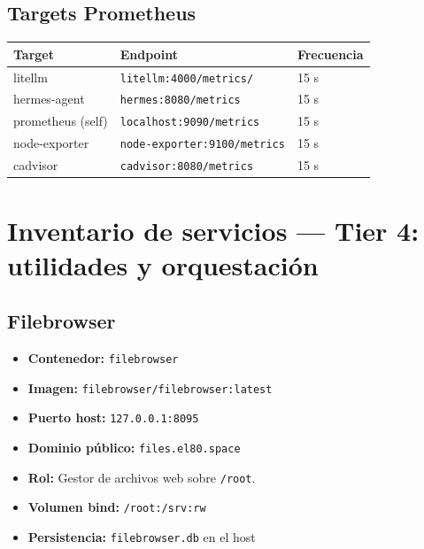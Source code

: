 \documentclass[11pt,a4paper]{article}
\newcommand{\dato}[2]{\textbf{\color{hermesblue}#1:} #2}
\begin{document}
\subsection{Targets Prometheus}

\begin{center}
\begin{tabular}{|l|l|l|}
\hline
\rowcolor{hermesblue}\color{white}\textbf{Target} & \color{white}\textbf{Endpoint} & \color{white}\textbf{Frecuencia}\\
\hline
litellm & \texttt{litellm:4000/metrics/} & 15 s\\
hermes-agent & \texttt{hermes:8080/metrics} & 15 s\\
prometheus (self) & \texttt{localhost:9090/metrics} & 15 s\\
node-exporter & \texttt{node-exporter:9100/metrics} & 15 s\\
cadvisor & \texttt{cadvisor:8080/metrics} & 15 s\\
\hline
\end{tabular}
\end{center}

\newpage

\section{Inventario de servicios — Tier 4: utilidades y orquestación}

\subsection{Filebrowser}

\begin{itemize}[leftmargin=*,itemsep=1pt]
\item \dato{Contenedor}{\texttt{filebrowser}}
\item \dato{Imagen}{\texttt{filebrowser/filebrowser:latest}}
\item \dato{Puerto host}{\texttt{127.0.0.1:8095}}
\item \dato{Dominio público}{\texttt{files.el80.space}}
\item \dato{Rol}{Gestor de archivos web sobre \texttt{/root}.}
\item \dato{Volumen bind}{\texttt{/root:/srv:rw}}
\item \dato{Persistencia}{\texttt{filebrowser.db} en el host}
\end{itemize}
\end{document}
